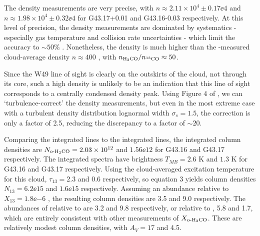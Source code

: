 The density measurements are very precise, with $n\approx2.11\times10^4 \pm
0.17\ee{4}$ \percc and $n\approx 1.98\times10^4 \pm 0.32\ee{4}$ \percc for
G43.17+0.01 and G43.16-0.03 respectively.  At this level of precision, the 
density measurements are dominated by systematics - especially gas temperature
and collision rate uncertainties - which limit the accuracy to $\sim50\%$
\citep{Zeiger2010}.  Nonetheless, the density is much higher than the
\thirteenco-measured cloud-average density $n\approx 400$ \percc
\citep[for cloud GRSMC\_G043.04-00.11;][]{Roman-Duval2010a}, with
$n_{\textrm{H}_2\textrm{CO}}/n_{^{13}\textrm{CO}} \approx 50$.  

Since the W49 line of sight is clearly on the outskirts of the cloud, not
through its core, such a high density is unlikely to be an indication that
this line of sight corresponds to a centrally condensed density peak.  Using
Figure 4 of \citet{Ginsburg2011a}, we can `turbulence-correct' the density
measurements, but even in the most extreme case with a turbulent density
distribution lognormal width $\sigma_s = 1.5$, the correction is only a factor
of 2.5, reducing the discrepancy to a factor of $\sim20$.


Comparing the integrated \formaldehyde lines to the integrated \thirteenco
lines, the integrated \formaldehyde column densities are
$N_{\textrm{o-H}_2\textrm{CO}} = 2.03\times10^{12} $ and $1.56\ee{12}$ \persc for G43.16
and G43.17 respectively.
The \thirteenco integrated spectra have brightness $T_{MB} = 2.6$ K and $1.3$ K
for G43.16 and G43.17 respectively.  Using the cloud-averaged excitation
temperature for this cloud, $\tau_{13}=2.3$ and $0.6$ respectively, so
\citet{Roman-Duval2010a} equation 3 yields column densities $N_{13} = 6.2\ee{15}
$ and $1.6\ee{15}$ \percc respectively.  Assuming an abundance relative to \hh
$X_{13} = 1.8\ee{-6}$ \citep[consistent with ][]{Roman-Duval2010a}, the
resulting \hh column densities are 3.5 and 9.0  \percc
respectively.  The abundances of \ortho relative to \thirteenco are 3.2
and 9.8 respectively, or relative to \hh, 5.8 and 1.7,
which are entirely consistent with other measurements of $X_{\textrm{o-H}_2\textrm{CO}}$.  These
are relatively modest column densities, with $A_V=17$ and 4.5.

